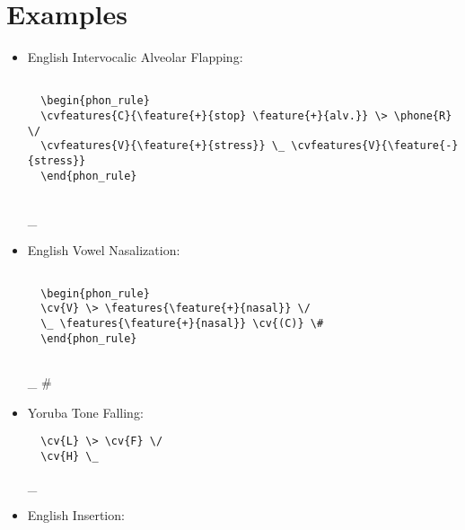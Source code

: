 \documentclass[11pt]{article}
\begin{document}
\section*{Examples}

\begin{itemize}

\item English Intervocalic Alveolar Flapping:

\begin{verbatim}
  
  \begin{phon_rule}
  \cvfeatures{C}{\feature{+}{stop} \feature{+}{alv.}} \> \phone{R} \/ 
  \cvfeatures{V}{\feature{+}{stress}} \_ \cvfeatures{V}{\feature{-}{stress}}
  \end{phon_rule}
    
\end{verbatim}

\begin{phon_rule}
 \>  \/ 
 \_ 
\end{phon_rule}

\item English Vowel Nasalization:

\begin{verbatim}
  
  \begin{phon_rule}
  \cv{V} \> \features{\feature{+}{nasal}} \/ 
  \_ \features{\feature{+}{nasal}} \cv{(C)} \#
  \end{phon_rule}
    
\end{verbatim}

\begin{phon_rule}
 \>  \/ 
\_   \#
\end{phon_rule}

\item Yoruba Tone Falling:

\begin{verbatim}
  \cv{L} \> \cv{F} \/
  \cv{H} \_
\end{verbatim}

\begin{phon_rule}
 \>  \/
 \_
\end{phon_rule}

\item English  Insertion:


\end{itemize}
\end{document}

